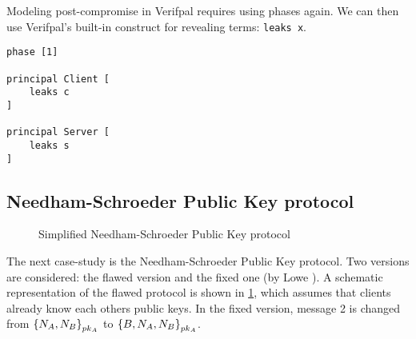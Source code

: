 \lstset{language=verifpal}
Modeling post-compromise in Verifpal requires using phases again. We can then use Verifpal's built-in construct for revealing terms: \lstinline{leaks x}.
\newpage
\begin{lstlisting}
phase [1]

principal Client [
    leaks c
]

principal Server [
    leaks s
]
\end{lstlisting}

\subsection{Needham-Schroeder Public Key protocol}
\label{sec:NSPK}

\begin{figure}[t]
    \setmscoptions
    \begin{msc}{}
    
    

    \nextlevel[4]


    \nextlevel[3]    
    \nextlevel



    \nextlevel[3]
    \nextlevel[2]

    \end{msc}

    \centering
    \caption{Simplified Needham-Schroeder Public Key protocol}
    \label{fig:NSPK}
\end{figure}

The next case-study is the Needham-Schroeder Public Key protocol. Two versions are considered: the flawed version and the fixed one (by Lowe \cite{NSPK_LoweGavin}). A schematic representation of the flawed protocol is shown in \cref{fig:NSPK}, which assumes that clients already know each others public keys. In the fixed version, message 2 is changed from $\left\{N_A, N_B\right\}_{pk_{A}}$ to $\left\{B, N_A, N_B\right\}_{pk_{A}}$.

